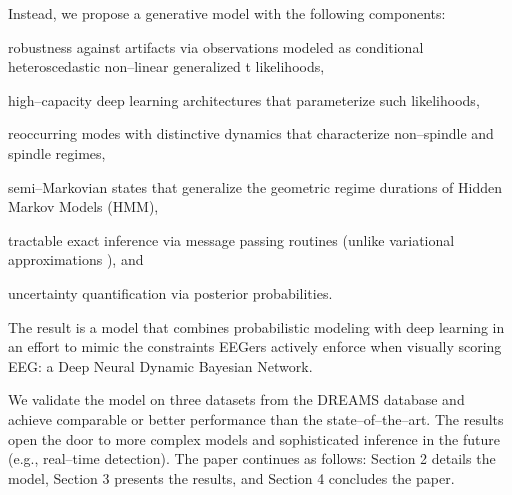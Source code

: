\documentclass[runningheads]{llncs}
\begin{document}
Instead, we propose a generative model with the following components: \begin{enumerate*}[label=\roman*)]
	\item robustness against artifacts via observations modeled as conditional heteroscedastic non--linear generalized t likelihoods,
	\item high--capacity deep learning architectures that parameterize such likelihoods,
	\item reoccurring modes with distinctive dynamics that characterize non--spindle and spindle regimes,
	\item semi--Markovian states that generalize the geometric regime durations of Hidden Markov Models (HMM),
	\item tractable exact inference via message passing routines (unlike variational approximations \cite{johnson2016composing,ebbers2017hidden,krishnan2017structured,dong2020collapsed}), and
	\item uncertainty quantification via posterior probabilities.
\end{enumerate*}
The result is a model that combines probabilistic modeling with deep learning in an effort to mimic the constraints EEGers actively enforce when visually scoring EEG: a Deep Neural Dynamic Bayesian Network.

We validate the model on three datasets from the DREAMS database \cite{stephanie_devuyst_2005_2650142} and achieve comparable or better performance than the state--of--the--art. The results open the door to more complex models and sophisticated inference in the future (e.g., real--time detection). The paper continues as follows: Section 2 details the model, Section 3 presents the results, and Section 4 concludes the paper.
\end{document}
